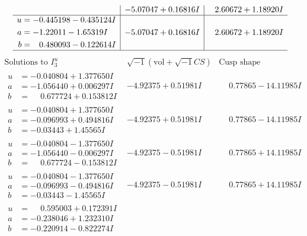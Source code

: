 \documentclass[1p]{elsarticle_modified}
\theoremstyle{definition}
\newcommand{\I}{\sqrt{-1}}
\begin{document}
$$\begin{array}{c|c|c}
 & -5.07047 + 0.16816 I & \phantom{-}2.60672 + 1.18920 I \\ \hline\begin{aligned}
u &= -0.445198 - 0.435124 I \\
a &= -1.22011 - 1.65319 I \\
b &= \phantom{-}0.480093 - 0.122614 I\end{aligned}
 & -5.07047 + 0.16816 I & \phantom{-}2.60672 + 1.18920 I\\
 \hline 
 \end{array}$$\newpage$$\begin{array}{c|c|c}  
\text{Solutions to }I^u_{3}& \I (\text{vol} + \sqrt{-1}CS) & \text{Cusp shape}\\
 \hline 
\begin{aligned}
u &= -0.040804 + 1.377650 I \\
a &= -1.056440 + 0.006297 I \\
b &= \phantom{-}0.677724 + 0.153812 I\end{aligned}
 & -4.92375 + 0.51981 I & \phantom{-}0.77865 - 14.11985 I \\ \hline\begin{aligned}
u &= -0.040804 + 1.377650 I \\
a &= -0.096993 + 0.494816 I \\
b &= -0.03443 + 1.45565 I\end{aligned}
 & -4.92375 + 0.51981 I & \phantom{-}0.77865 - 14.11985 I \\ \hline\begin{aligned}
u &= -0.040804 - 1.377650 I \\
a &= -1.056440 - 0.006297 I \\
b &= \phantom{-}0.677724 - 0.153812 I\end{aligned}
 & -4.92375 - 0.51981 I & \phantom{-}0.77865 + 14.11985 I \\ \hline\begin{aligned}
u &= -0.040804 - 1.377650 I \\
a &= -0.096993 - 0.494816 I \\
b &= -0.03443 - 1.45565 I\end{aligned}
 & -4.92375 - 0.51981 I & \phantom{-}0.77865 + 14.11985 I \\ \hline\begin{aligned}
u &= \phantom{-}0.595003 + 0.172391 I \\
a &= -0.238046 + 1.232310 I \\
b &= -0.220914 - 0.822274 I\end{aligned}

\end{array}$$
\end{document}
